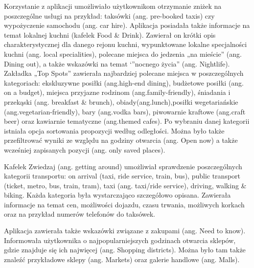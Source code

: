 \documentclass[10pt,twoside,a4paper]{report}
\begin{document}
\par Korzystanie z aplikacji umożliwiało użytkownikom otrzymanie zniżek na poszczególne usługi na przykład: taksówki (ang. pre-booked taxis) czy wypożyczenie samochodu (ang. car hire).
Aplikacja posiadała także informacje na temat lokalnej kuchni (kafelek Food \& Drink). Zawierał on krótki opis charakterystycznej dla danego rejonu kuchni, wypunktowane lokalne specjalności kuchni (ang. local specialities), polecane miejsca do jedzenia „na mieście” (ang. Dining out), a także wskazówki na temat ‘”nocnego życia” (ang. Nightlife). Zakładka „Top Spots” zawierała najbardziej polecane miejsca w poszczególnych kategoriach: ekskluzywne posiłki (ang.high-end dining), budżetowe posiłki (ang. on a budget), miejsca przyjazne rodzinom (ang.family-friendly), śniadania i przekąski (ang. breakfast \& brunch), obiady(ang.lunch),posiłki wegetariańskie (ang.vegetarian-friendly), bary (ang.vodka bars), piwowarnie kraftowe (ang.craft beer) oraz kawiarnie tematyczne (ang.themed cafes). Po wybraniu danej kategorii istniała opcja sortowania propozycji według odległości. Można było także przefiltrować wyniki ze względu na godziny otwarcia (ang. Open now) a także wcześniej zapisanych pozycji (ang. only saved places).
\par Kafelek Zwiedzaj (ang. getting around) umożliwiał sprawdzenie poszczególnych kategorii transportu: on arrival (taxi, ride service, train, bus), public transport (ticket, metro, bus, train, tram), taxi (ang. taxi/ride service), driving, walking \& biking. Każda kategoria była wystarczająco szczegółowo opisana. Zawierała informacje na temat cen, możliwości dojazdu, czasu trwania, możliwych korkach oraz na przykład numerów telefonów do taksówek.
\par Aplikacja zawierała także wskazówki związane z zakupami (ang. Need to know). Informowała użytkownika o najpopularniejszych godzinach otwarcia sklepów, gdzie znajduje się ich najwięcej (ang. Shopping districts). Można było tam także znaleźć przykładowe sklepy (ang. Markets) oraz galerie handlowe (ang. Malls).
 
\end{document}
